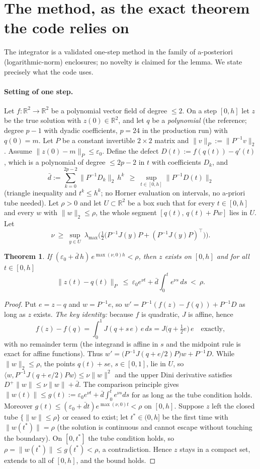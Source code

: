 \documentclass[11pt]{article}
\newcommand{\R}{\mathbb{R}}
\newcommand{\nrm}[1]{\lVert #1\rVert}
\newtheorem{thm}{Theorem}
\theoremstyle{remark}
\begin{document}
\section{The method, as the exact theorem the code relies on}\label{sec:method}
The integrator is a validated one-step method in the family of a-posteriori (logarithmic-norm) enclosures; no novelty is claimed for the lemma. We state precisely what the code uses.

\paragraph{Setting of one step.} Let $f:\R^2\to\R^2$ be a polynomial vector field of degree $\le2$. On a step $[0,h]$ let $z$ be the true solution with $z(0)\in\R^2$, and let $q$ be a \emph{polynomial} (the reference; degree $p-1$ with dyadic coefficients, $p=24$ in the production run) with $q(0)=m$. Let $P$ be a constant invertible $2\times2$ matrix and $\nrm{v}_P:=\nrm{P^{-1}v}_2$. Assume $\nrm{z(0)-m}_P\le\varepsilon_0$.
Define the defect $D(t):=f(q(t))-q'(t)$, which is a polynomial of degree $\le2p-2$ in $t$ with coefficients $D_k$, and
\[
\bar d:=\sum_{k=0}^{2p-2}\nrm{P^{-1}D_k}_2\,h^k\ \ \ge\ \sup_{t\in[0,h]}\nrm{P^{-1}D(t)}_2
\]
(triangle inequality and $t^k\le h^k$; no Horner evaluation on intervals, no a-priori tube needed). Let $\rho>0$ and let $U\subset\R^2$ be a box such that for every $t\in[0,h]$ and every $w$ with $\nrm{w}_2\le\rho$, the whole segment $[q(t),\,q(t)+Pw]$ lies in $U$. Let
\[
\nu\ \ge\ \sup_{y\in U}\ \lambda_{\max}\!\Big(\tfrac12\big(P^{-1}J(y)P+(P^{-1}J(y)P)^{\!\top}\big)\Big).
\]

\begin{thm}\label{thm:step}
If $(\varepsilon_0+\bar d\,h)\,e^{\max(\nu,0)h}<\rho$, then $z$ exists on $[0,h]$ and for all $t\in[0,h]$
\[
\nrm{z(t)-q(t)}_P\ \le\ \varepsilon_0e^{\nu t}+\bar d\int_0^te^{\nu s}\,ds\ <\ \rho .
\]
\end{thm}
\begin{proof}
Put $e=z-q$ and $w=P^{-1}e$, so $w'=P^{-1}(f(z)-f(q))+P^{-1}D$ as long as $z$ exists. \emph{The key identity:} because $f$ is quadratic, $J$ is affine, hence
\[
f(z)-f(q)=\int_0^1J(q+s\,e)\,e\,ds=J\!\big(q+\tfrac12e\big)\,e\quad\text{exactly},
\]
with no remainder term (the integrand is affine in $s$ and the midpoint rule is exact for affine functions). Thus $w'=\big(P^{-1}J(q+e/2)P\big)w+P^{-1}D$.
While $\nrm{w}_2\le\rho$, the points $q(t)+se$, $s\in[0,1]$, lie in $U$, so $\langle w,P^{-1}J(q+e/2)Pw\rangle\le\nu\nrm{w}^2$ and the upper Dini derivative satisfies $D^+\nrm{w}\le\nu\nrm{w}+\bar d$. The comparison principle gives $\nrm{w(t)}\le g(t):=\varepsilon_0e^{\nu t}+\bar d\int_0^te^{\nu s}ds$ for as long as the tube condition holds. Moreover $g(t)\le(\varepsilon_0+\bar dt)e^{\max(\nu,0)t}<\rho$ on $[0,h]$.
Suppose $z$ left the closed tube $\{\nrm{w}\le\rho\}$ or ceased to exist; let $t^*\in(0,h]$ be the first time with $\nrm{w(t^*)}=\rho$ (the solution is continuous and cannot escape without touching the boundary). On $[0,t^*]$ the tube condition holds, so $\rho=\nrm{w(t^*)}\le g(t^*)<\rho$, a contradiction. Hence $z$ stays in a compact set, extends to all of $[0,h]$, and the bound holds.
\end{proof}
\end{document}
